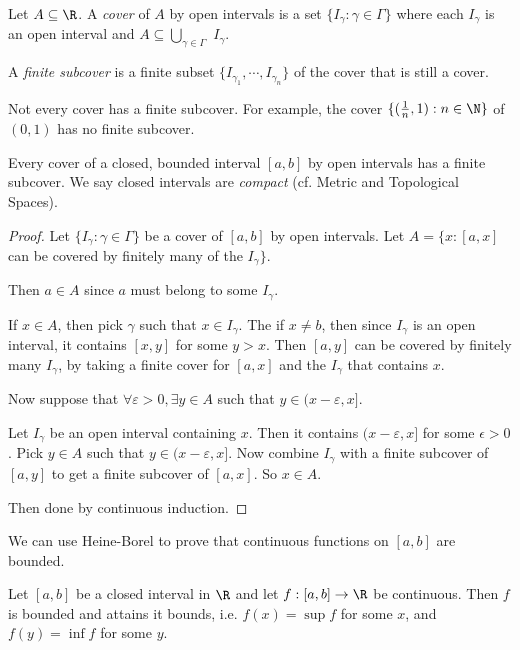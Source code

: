 \documentclass[a4paper]{article}
\begin{document}
\begin{defi}
  Let $A\subseteq \R$. A \emph{cover} of $A$ by open intervals is a set $\{I_\gamma: \gamma\in \Gamma\}$ where each $I_\gamma$ is an open interval and $A \subseteq \bigcup_{\gamma\in \Gamma}$ $I_\gamma$.

  A \emph{finite subcover} is a finite subset $\{I_{\gamma_1}, \cdots, I_{\gamma_n}\}$ of the cover that is still a cover.
\end{defi}

Not every cover has a finite subcover. For example, the cover $\{(\frac{1}{n}, 1): n\in \N\}$ of $(0, 1)$ has no finite subcover.

\begin{thm}
  Every cover of a closed, bounded interval $[a, b]$ by open intervals has a finite subcover. We say closed intervals are \emph{compact} (cf. Metric and Topological Spaces).
\end{thm}

\begin{proof}
  Let $\{I_\gamma: \gamma\in \Gamma\}$ be a cover of $[a, b]$ by open intervals. Let $A = \{x: [a, x]$ can be covered by finitely many of the $I_\gamma\}$.

  Then $a\in A$ since $a$ must belong to some $I_\gamma$.

  If $x\in A$, then pick $\gamma$ such that $x\in I_\gamma$. The if $x\not = b$, then since $I_\gamma$ is an open interval, it contains $[x, y]$ for some $y > x$. Then $[a, y]$ can be covered by finitely many $I_\gamma$, by taking a finite cover for $[a, x]$ and the $I_\gamma$ that contains $x$.

  Now suppose that $\forall \varepsilon > 0, \exists y\in A$ such that $y\in (x - \varepsilon, x]$.

  Let $I_\gamma$ be an open interval containing $x$. Then it contains $(x - \varepsilon, x]$ for some $\epsilon > 0$. Pick $y\in A$ such that $y\in (x - \varepsilon, x]$. Now combine $I_\gamma$ with a finite subcover of $[a, y]$ to get a finite subcover of $[a, x]$. So $x\in A$.

  Then done by continuous induction.
\end{proof}

We can use Heine-Borel to prove that continuous functions on $[a, b]$ are bounded.

\begin{thm}
  Let $[a, b]$ be a closed interval in $\R$ and let $f: [a, b] \to \R$ be continuous. Then $f$ is bounded and attains it bounds, i.e. $f(x) = \sup f$ for some $x$, and $f(y) = \inf f$ for some $y$.
\end{thm}
\end{document}
